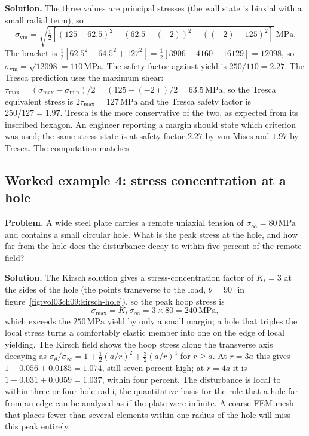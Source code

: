 \textbf{Solution.} The three values are principal stresses (the wall
state is biaxial with a small radial term), so
\[
\sigma_{\text{vm}} = \sqrt{\tfrac{1}{2}\left[(125-62.5)^2 +
(62.5-(-2))^2 + ((-2)-125)^2\right]}\ \text{MPa}.
\]
The bracket is $\tfrac{1}{2}[62.5^2 + 64.5^2 + 127^2] =
\tfrac{1}{2}[3906 + 4160 + 16129] = 12098$, so $\sigma_{\text{vm}} =
\sqrt{12098} = 110\,\text{MPa}$. The safety factor against yield is
$250/110 = 2.27$. The Tresca prediction uses the maximum shear:
$\tau_{\max} = (\sigma_{\max} - \sigma_{\min})/2 = (125-(-2))/2 =
63.5\,\text{MPa}$, so the Tresca equivalent stress is $2\tau_{\max} =
127\,\text{MPa}$ and the Tresca safety factor is $250/127 = 1.97$.
Tresca is the more conservative of the two, as expected from its
inscribed hexagon. An engineer reporting a margin should state which
criterion was used; the same stress state is at safety factor $2.27$ by
von Mises and $1.97$ by Tresca. The computation matches
.

\subsection*{Worked example 4: stress concentration at a hole}

\textbf{Problem.} A wide steel plate carries a remote uniaxial tension
of $\sigma_\infty = 80\,\text{MPa}$ and contains a small circular hole.
What is the peak stress at the hole, and how far from the hole does the
disturbance decay to within five percent of the remote field?

\textbf{Solution.} The Kirsch solution gives a stress-concentration
factor of $K_t = 3$ at the sides of the hole (the points transverse to
the load, $\theta = 90^\circ$ in figure~\ref{fig:vol03ch09:kirsch-hole}),
so the peak hoop stress is
\[
\sigma_{\max} = K_t\,\sigma_\infty = 3\times 80 = 240\,\text{MPa},
\]
which exceeds the $250\,\text{MPa}$ yield by only a small margin; a
hole that triples the local stress turns a comfortably elastic member
into one on the edge of local yielding. The Kirsch field shows the
hoop stress along the transverse axis decaying as $\sigma_\theta/
\sigma_\infty = 1 + \tfrac{1}{2}(a/r)^2 + \tfrac{3}{2}(a/r)^4$ for
$r \ge a$. At $r = 3a$ this gives $1 + 0.056 + 0.0185 = 1.074$, still
seven percent high; at $r = 4a$ it is $1 + 0.031 + 0.0059 = 1.037$,
within four percent. The disturbance is local to within three or four
hole radii, the quantitative basis for the rule that a hole far from
an edge can be analysed as if the plate were infinite. A coarse FEM
mesh that places fewer than several elements within one radius of the
hole will miss this peak entirely.

